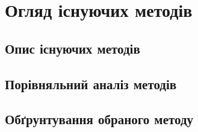 \chapter{Огляд існуючих методів}
\section{Опис існуючих методів}
\section{Порівняльний аналіз методів}
\section{Обґрунтування обраного методу}

